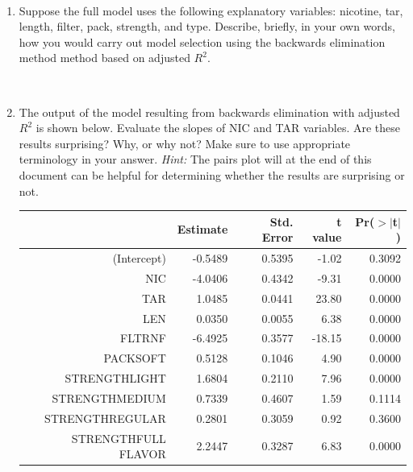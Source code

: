\documentclass[11pt]{article}
\newcommand{\soln}[2]{$\:$\\ \vspace{#1}}{}
\begin{document}
$\:$ 

\begin{enumerate}

\item Suppose the full model uses the following explanatory variables: nicotine, tar, length, filter, pack, strength, and type.
Describe, briefly, in your own words, how you would carry out model selection using the backwards elimination method
method based on adjusted $R^2$.

\soln{2cm}{
Fit full model, record its adjusted $R^2$. Then, drop one variable at a time, record each model's adjusted $R^2$. Then, move to the
model with the highest adjusted $R^2$. Stop when adjusted $R^2$ stops increasing.
}

% 

\pagebreak

\item The output of the model resulting from backwards elimination with adjusted $R^2$ is shown below. Evaluate the slopes of NIC and 
TAR variables. Are these results surprising? Why, or why not? Make sure to use appropriate terminology in your answer. \textit{Hint:} The 
pairs plot will at the end of this document can be helpful for determining whether the results are surprising or not.

\begin{minipage}[c]{0.55\textwidth}
{\footnotesize
\begin{tabular}{rrrrr}
  \hline
 & Estimate & Std. Error & t value & Pr($>$$|$t$|$) \\ 
  \hline
(Intercept) & -0.5489 & 0.5395 & -1.02 & 0.3092 \\ 
  NIC & -4.0406 & 0.4342 & -9.31 & 0.0000 \\ 
  TAR & 1.0485 & 0.0441 & 23.80 & 0.0000 \\ 
  LEN & 0.0350 & 0.0055 & 6.38 & 0.0000 \\ 
  FLTRNF & -6.4925 & 0.3577 & -18.15 & 0.0000 \\ 
  PACKSOFT & 0.5128 & 0.1046 & 4.90 & 0.0000 \\ 
  STRENGTHLIGHT & 1.6804 & 0.2110 & 7.96 & 0.0000 \\ 
  STRENGTHMEDIUM & 0.7339 & 0.4607 & 1.59 & 0.1114 \\ 
  STRENGTHREGULAR & 0.2801 & 0.3059 & 0.92 & 0.3600 \\ 
  STRENGTHFULL FLAVOR & 2.2447 & 0.3287 & 6.83 & 0.0000 \\ 
   \hline
\end{tabular}
}
\end{minipage}
\begin{minipage}[c]{0.4\textwidth}
\soln{3cm}{
Yes, according to this model output, as nicotine increases CO emission decreases. But we know from the pairs plot that nicotine and CO are
positively associated. This is likely due to multicollinearity in the model -- nicotine and tar are strongly correlated, resulting in unreliable
slope estimates.
}
\end{minipage}


\end{enumerate}
\end{document}
